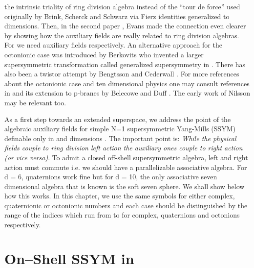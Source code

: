 \documentclass[a4paper,12pt]{book}
\begin{document}
the intrinsic triality of ring division algebra instead of the ``tour de
force'' used originally by Brink, Scherck and Schwarz \cite{r0} via Fierz
identities generalized to \coordHE{} dimensions. Then, in the second paper \cite
{r6}, Evans made the connection even clearer by showing how the auxiliary
fields are really related to ring division algebras. For \coordHE{} we
need \coordHE{} auxiliary fields respectively. An alternative approach for
the octonionic case was introduced by Berkovits \cite{r7} who invented a
larger supersymmetric transformation called generalized supersymmetry in 
\cite{r8}. There has also been a twistor attempt by Bengtsson and Cederwall 
\cite{r9}. For more references about the octonionic case and ten dimensional
physics one may consult references in \cite{r10} and its extension to
p-branes by Belecowe and Duff \cite{r11}. The early work of Nilsson may be
relevant \cite{r12}\cite{r13} too.

As a first step towards an extended superspace, we address the point of the
algebraic auxiliary fields for simple N=1 supersymmetric Yang-Mills (SSYM)
definable only in \coordHE{} and \coordHE{} dimensions \cite{r0}. The important
point is: \emph{While the physical fields couple to ring division left
action the auxiliary ones couple to right action (or vice versa)}. To admit
a closed off-shell supersymmetric algebra, left and right action must
commute i.e. we should have a parallelizable associative algebra. For d = 6,
quaternions work fine but for d = 10, the only associative seven dimensional
algebra that is known is the soft seven sphere. We shall show below how this
works. In this chapter, we use the same symbols \coordHE{} for either complex, quaternionic
or octonionic numbers and each case should be distinguished by the range of
the indices \coordHE{} which run from \coordHE{} to \coordHE{} for complex,
quaternions and octonions respectively.

\section{On--Shell SSYM in \coordHE{}}
\end{document}
